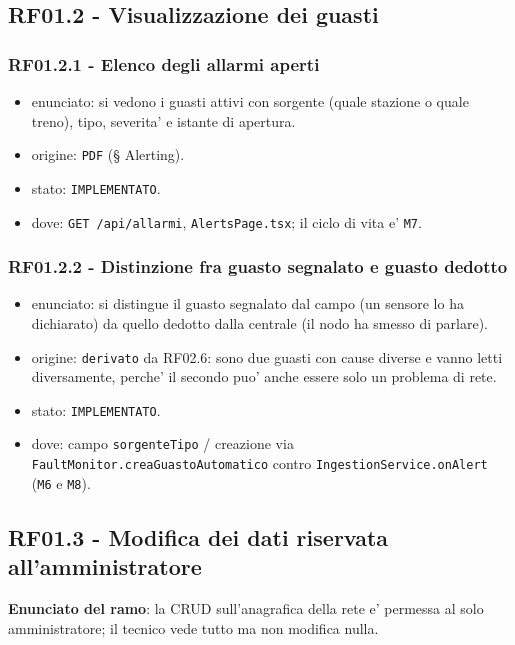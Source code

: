 \documentclass[11pt]{article}
\begin{document}
\subsection{RF01.2 - Visualizzazione dei guasti}
\label{sec:org5adc338}

\subsubsection{RF01.2.1 - Elenco degli allarmi aperti}
\label{sec:org1060b67}
\begin{itemize}
\item enunciato: si vedono i guasti attivi con sorgente (quale stazione o quale treno), tipo, severita'
e istante di apertura.
\item origine: \texttt{PDF} (§ Alerting).
\item stato: \texttt{IMPLEMENTATO}.
\item dove: \texttt{GET /api/allarmi}, \texttt{AlertsPage.tsx}; il ciclo di vita e' \texttt{M7}.
\end{itemize}
\subsubsection{RF01.2.2 - Distinzione fra guasto segnalato e guasto dedotto}
\label{sec:orgf463999}
\begin{itemize}
\item enunciato: si distingue il guasto segnalato dal campo (un sensore lo ha dichiarato) da quello
dedotto dalla centrale (il nodo ha smesso di parlare).
\item origine: \texttt{derivato} da RF02.6: sono due guasti con cause diverse e vanno letti diversamente,
perche' il secondo puo' anche essere solo un problema di rete.
\item stato: \texttt{IMPLEMENTATO}.
\item dove: campo \texttt{sorgenteTipo} / creazione via \texttt{FaultMonitor.creaGuastoAutomatico} contro
\texttt{IngestionService.onAlert} (\texttt{M6} e \texttt{M8}).
\end{itemize}
\subsection{RF01.3 - Modifica dei dati riservata all'amministratore}
\label{sec:org5a46935}

\textbf{Enunciato del ramo}: la CRUD sull'anagrafica della rete e' permessa al solo amministratore; il
tecnico vede tutto ma non modifica nulla.
\end{document}
